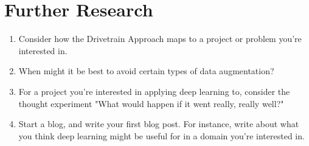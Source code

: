 \documentclass[12pt,a4paper]{article}
\begin{document}
\section*{Further Research}

\begin{enumerate}
\item Consider how the Drivetrain Approach maps to a project or problem you're interested in. \\
\item When might it be best to avoid certain types of data augmentation? \\
\item For a project you're interested in applying deep learning to, consider the thought experiment "What would happen if it went really, really well?" \\
\item Start a blog, and write your first blog post. For instance, write about what you think deep learning might be useful for in a domain you're interested in. \\
\end{enumerate}
\end{document}
